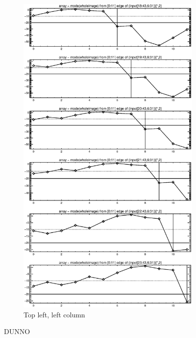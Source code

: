 \documentclass[10pt]{article}
\begin{document}
\begin{figure}[!h]
\begin{subfigure}[b]{.4\linewidth}
        \centering
        \includegraphics[width=1.4\textwidth]{plots_tables_images/topright1.eps} 
        \caption{Top left, left column}
    \end{subfigure}
    \caption{DUNNO}
\end{figure}
\end{document}

